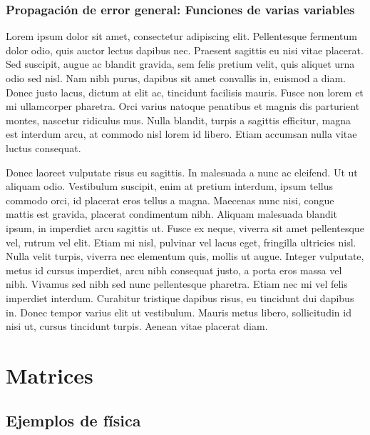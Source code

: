 \documentclass[11pt]{article}
\begin{document}
\hypertarget{propagaciuxf3n-de-error-general-funciones-de-varias-variables}{%
\subsubsection{Propagación de error general: Funciones de varias
variables}\label{propagaciuxf3n-de-error-general-funciones-de-varias-variables}}

Lorem ipsum dolor sit amet, consectetur adipiscing elit. Pellentesque
fermentum dolor odio, quis auctor lectus dapibus nec. Praesent sagittis
eu nisi vitae placerat. Sed suscipit, augue ac blandit gravida, sem
felis pretium velit, quis aliquet urna odio sed nisl. Nam nibh purus,
dapibus sit amet convallis in, euismod a diam. Donec justo lacus, dictum
at elit ac, tincidunt facilisis mauris. Fusce non lorem et mi
ullamcorper pharetra. Orci varius natoque penatibus et magnis dis
parturient montes, nascetur ridiculus mus. Nulla blandit, turpis a
sagittis efficitur, magna est interdum arcu, at commodo nisl lorem id
libero. Etiam accumsan nulla vitae luctus consequat.

Donec laoreet vulputate risus eu sagittis. In malesuada a nunc ac
eleifend. Ut ut aliquam odio. Vestibulum suscipit, enim at pretium
interdum, ipsum tellus commodo orci, id placerat eros tellus a magna.
Maecenas nunc nisi, congue mattis est gravida, placerat condimentum
nibh. Aliquam malesuada blandit ipsum, in imperdiet arcu sagittis ut.
Fusce ex neque, viverra sit amet pellentesque vel, rutrum vel elit.
Etiam mi nisl, pulvinar vel lacus eget, fringilla ultricies nisl. Nulla
velit turpis, viverra nec elementum quis, mollis ut augue. Integer
vulputate, metus id cursus imperdiet, arcu nibh consequat justo, a porta
eros massa vel nibh. Vivamus sed nibh sed nunc pellentesque pharetra.
Etiam nec mi vel felis imperdiet interdum. Curabitur tristique dapibus
risus, eu tincidunt dui dapibus in. Donec tempor varius elit ut
vestibulum. Mauris metus libero, sollicitudin id nisi ut, cursus
tincidunt turpis. Aenean vitae placerat diam.

    \hypertarget{matrices}{%
\section{Matrices}\label{matrices}}

\hypertarget{ejemplos-de-fuxedsica}{%
\subsection{Ejemplos de física}\label{ejemplos-de-fuxedsica}}
\end{document}
